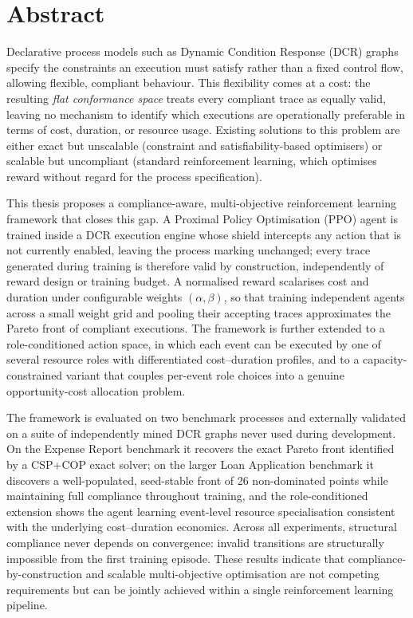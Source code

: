 \chapter*{Abstract}

Declarative process models such as Dynamic Condition Response (DCR)
graphs specify the constraints an execution must satisfy rather than a
fixed control flow, allowing flexible, compliant behaviour. This
flexibility comes at a cost: the resulting \emph{flat conformance
space} treats every compliant trace as equally valid, leaving no
mechanism to identify which executions are operationally
preferable in terms of cost, duration, or resource usage. Existing
solutions to this problem are either exact but unscalable (constraint
and satisfiability-based optimisers) or scalable but uncompliant
(standard reinforcement learning, which optimises reward without
regard for the process specification).

This thesis proposes a compliance-aware, multi-objective reinforcement
learning framework that closes this gap. A Proximal Policy Optimisation
(PPO) agent is trained inside a DCR execution engine whose shield
intercepts any action that is not currently enabled, leaving the
process marking unchanged; every trace generated during training is
therefore valid by construction, independently of reward design or
training budget. A normalised reward scalarises cost and duration under
configurable weights $(\alpha,\beta)$, so that training independent
agents across a small weight grid and pooling their accepting traces
approximates the Pareto front of compliant executions. The framework is
further extended to a role-conditioned action space, in which each
event can be executed by one of several resource roles with
differentiated cost--duration profiles, and to a capacity-constrained
variant that couples per-event role choices into a genuine
opportunity-cost allocation problem.

The framework is evaluated on two benchmark processes and externally
validated on a suite of independently mined DCR graphs never used
during development. On the Expense Report benchmark it recovers the
exact Pareto front identified by a CSP+COP exact solver; on the larger
Loan Application benchmark it discovers a well-populated, seed-stable
front of 26 non-dominated points while maintaining full compliance
throughout training, and the role-conditioned extension shows the agent
learning event-level resource specialisation consistent with the
underlying cost--duration economics. Across all experiments, structural
compliance never depends on convergence: invalid transitions are
structurally impossible from the first training episode. These results
indicate that compliance-by-construction and scalable multi-objective
optimisation are not competing requirements but can be jointly achieved
within a single reinforcement learning pipeline.
